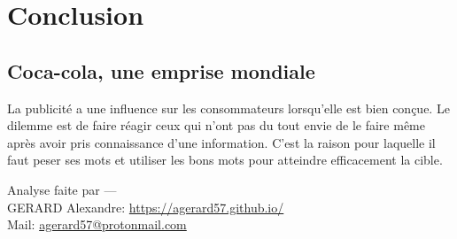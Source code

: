 \chapter{Conclusion}

\label{Conclusion}

\section{Coca-cola, une emprise mondiale}

La publicité a une influence sur les consommateurs lorsqu’elle est bien conçue. Le dilemme est de faire réagir ceux qui n’ont pas du tout envie de le faire même après avoir pris connaissance d’une information. C’est la raison pour laquelle il faut peser ses mots et utiliser les bons mots pour atteindre efficacement la cible.

\hfill \break



\begin{flushright}
Analyse faite par ---\\
GERARD Alexandre: \href{https://agerard57.github.io/}{https://agerard57.github.io/}\\
Mail: \href{mailto:agerard57@protonmail.com}{agerard57@protonmail.com}
\end{flushright}
